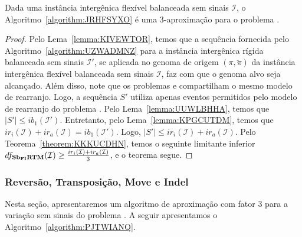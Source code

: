 \begin{theorem}\label{theorem:YTAKVOTU}
Dada uma instância intergênica flexível balanceada sem sinais $\mathcal{I}$, o Algoritmo~\ref{algorithm:JRHFSYXO} é uma $3$-aproximação para o problema \SbFIRTM{}.
\end{theorem}
\begin{proof}
Pelo Lema~\ref{lemma:KIVEWTOR}, temos que a sequência fornecida pelo Algoritmo~\ref{algorithm:UZWADMNZ} para a instância intergênica rígida balanceada sem sinais $\mathcal{I'}$, se aplicada no genoma de origem $(\pi,\breve\pi)$ da instância intergênica flexível balanceada sem sinais $\mathcal{I}$, faz com que o genoma alvo seja alcançado. Além disso, note que os problemas \SbIRTM{} e \SbFIRTM{} compartilham o mesmo modelo de rearranjo. Logo, a sequência $S'$ utiliza apenas eventos permitidos pelo modelo de rearranjo do problema \SbFIRTM{}. Pelo Lema~\ref{lemma:UUWLBHHA}, temos que $|S'| \le ib_1(\mathcal{I}')$. Entretanto, pelo Lema~\ref{lemma:KPGCUTDM}, temos que $ir_i(\mathcal{I}) + ir_a(\mathcal{I}) = ib_1(\mathcal{I'})$. Logo, $|S'| \le ir_i(\mathcal{I}) + ir_a(\mathcal{I})$. Pelo Teorema~\ref{theorem:KKKUCDHN}, temos o seguinte limitante inferior $df_{\textbf{Sb\textsubscript{FI}RTM}}(\mathcal{I}) \ge \frac{ir_i(\mathcal{I}) + ir_a(\mathcal{I})}{3}$, e o teorema segue.
\end{proof}

\subsubsection{Reversão, Transposição, Move e Indel}

Nesta seção, apresentaremos um algoritmo de aproximação com fator $3$ para a variação sem sinais do problema \SbFIRTMI{}. A seguir apresentamos o Algoritmo~\ref{algorithm:PJTWIANQ}.



